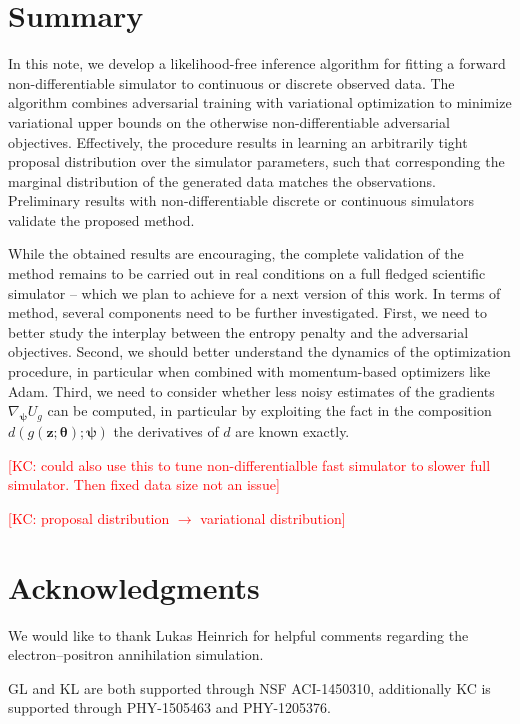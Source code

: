\documentclass[twocolumn,superscriptaddress,aps]{revtex4-1}
\newcommand{\kcnote}[1]{\textcolor{red}{[KC: #1]}}
\newcommand{\bftheta}{{\bm \theta}}
\newcommand{\bfpsi}{{\bm \psi}}
\newcommand{\bfz}{\mathbf{z}}
\theoremstyle{plain}
\begin{document}

\section{Summary}

In this note, we develop a likelihood-free inference algorithm for fitting a
forward non-differentiable simulator to continuous or discrete observed data.
The algorithm combines adversarial training  with variational optimization to
minimize variational upper bounds  on the otherwise non-differentiable
adversarial objectives.
Effectively, the procedure results in learning an arbitrarily tight proposal
distribution over the simulator parameters, such that corresponding the marginal
distribution of the generated data matches the observations. Preliminary results
with non-differentiable discrete or continuous simulators validate the proposed method.

While the obtained results are encouraging, the complete validation of the
method remains to be carried out in real conditions on a full fledged scientific
simulator -- which we plan to achieve for a next version of this work.
In terms of method, several components need to be further investigated.
First, we need to better study the interplay between the entropy penalty and the adversarial objectives.
Second, we should better understand the dynamics of the optimization
procedure, in particular when combined with momentum-based optimizers like Adam.
Third, we need to consider whether less noisy estimates of the gradients
$\nabla_\bfpsi U_g$ can be computed, in particular by exploiting the fact in the composition $d(g(\bfz;\bftheta); \bfpsi)$
the derivatives of $d$ are known exactly.


\kcnote{could also use this to tune non-differentialble fast simulator to slower full simulator. Then fixed data size not an issue}

\kcnote{proposal distribution $\to$ variational distribution}


\section*{Acknowledgments}

We would like to thank Lukas Heinrich for helpful comments regarding
the electron--positron annihilation simulation.

GL and KL are both supported through NSF ACI-1450310, additionally KC is
supported through PHY-1505463 and PHY-1205376.



%


\end{document}

